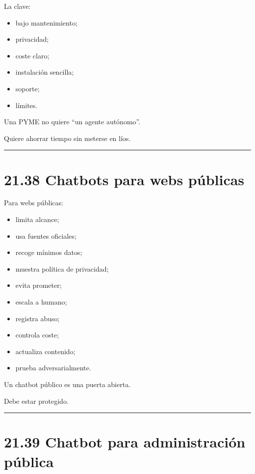 La clave:

\begin{itemize}
\tightlist
\item
  bajo mantenimiento;
\item
  privacidad;
\item
  coste claro;
\item
  instalación sencilla;
\item
  soporte;
\item
  límites.
\end{itemize}

Una PYME no quiere ``un agente autónomo''.

Quiere ahorrar tiempo sin meterse en líos.

\begin{center}\rule{0.5\linewidth}{0.5pt}\end{center}

\section{21.38 Chatbots para webs
públicas}\label{chatbots-para-webs-puxfablicas}

Para webs públicas:

\begin{itemize}
\tightlist
\item
  limita alcance;
\item
  usa fuentes oficiales;
\item
  recoge mínimos datos;
\item
  muestra política de privacidad;
\item
  evita prometer;
\item
  escala a humano;
\item
  registra abuso;
\item
  controla coste;
\item
  actualiza contenido;
\item
  prueba adversarialmente.
\end{itemize}

Un chatbot público es una puerta abierta.

Debe estar protegido.

\begin{center}\rule{0.5\linewidth}{0.5pt}\end{center}

\section{21.39 Chatbot para administración
pública}\label{chatbot-para-administraciuxf3n-puxfablica}

